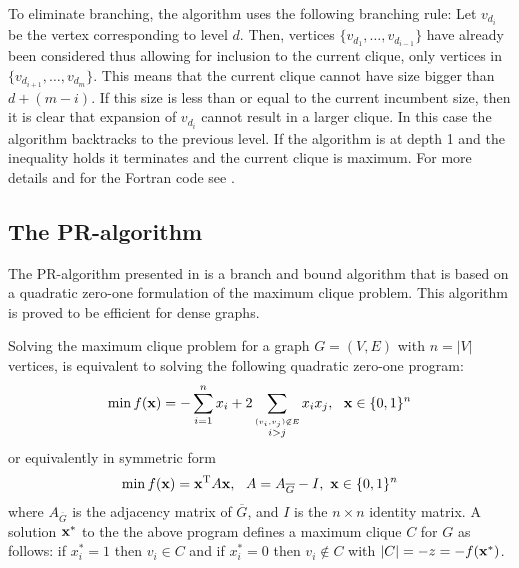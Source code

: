 To eliminate branching, the algorithm uses the following branching rule:
Let $v_{d_i}$ be the vertex corresponding to level $d$. Then, vertices
$\{v_{d_1},\ldots,v_{d_{i-1}}\}$ have already been considered thus allowing
for inclusion to the current clique, only vertices in
$\{v_{d_{i+1}},\ldots,v_{d_{m}}\}$. This means that the current clique cannot
have size bigger than $d+(m-i)$. If this size is less than or equal to the
current incumbent size, then it is clear that expansion of $v_{d_i}$ cannot
result in a larger clique. In this case the algorithm backtracks to the
previous level. If the algorithm is at depth 1 and the inequality
holds it terminates and the current clique is maximum. For more details and for
the Fortran code see \cite{CP}.

%

\subsection{The PR-algorithm}

The PR-algorithm presented in \cite{PR} is a branch and bound algorithm that
is based on a quadratic zero-one formulation of the maximum clique problem.
This algorithm is proved to be efficient for dense graphs. 

Solving the maximum clique problem for a graph $G = (V,E)$ with $n =
|V|$ vertices, is equivalent to solving the following quadratic
zero-one program:
\begin{displaymath}
\min f({\bf x}) = - \sum_{i = 1}^{n} x_{i} + 
2 \sum_{\stackrel{(v_{i},v_{j})\not\in E}{i>j}}x_{i}x_{j},\ \ 
{\bf x}\in \{0,1\}^{n}
\end{displaymath}
or equivalently in symmetric form
\begin{displaymath}
\min f({\bf x}) = {\bf x}^{\rm T}A{\bf x},\ \ 
A = A_{\overline{G}}-I,\ {\bf x}\in \{0,1\}^{n}
\end{displaymath}
where $A_{\overline{G}}$ is the adjacency matrix of $\overline{G}$, and $I$ is
the $n\times n$ identity matrix. A solution ${\bf x}^{*}$ to the the
above program defines a maximum clique $C$ for $G$ as follows: if
$x_{i}^{*} = 1$ then $v_{i}\in C$ and if $x_{i}^{*} = 0$ then
$v_{i}\not\in C$ with $|C| = -z = -f({\bf x}^{*})$.

